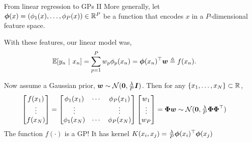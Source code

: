 \documentclass[aspectratio=169]{beamer}
\begin{document}
\begin{frame}{From linear regression to GPs II}
\label{slide:linreg}
More generally, let $\boldsymbol{\phi}(x) = (\phi_1(x), \ldots, \phi_P(x)) \in \mathbb{R}^P$ be a function that encodes $x$ in a $P$-dimensional feature space. 

With these features, our linear model was,
\begin{align}
    \mathbb{E}[y_n ~\vert~ x_n] = \sum_{p=1}^P w_p \phi_p(x_n) = \boldsymbol{\phi}(x_n)^\top \boldsymbol{w} &\triangleq f(x_n).
\end{align}

Now assume a Gaussian prior, $\boldsymbol{w} \sim \mathcal{N}(\boldsymbol{0}, \tfrac{\lambda}{P} \boldsymbol{I})$. Then for any $\{x_1, \ldots, x_N\} \subset \mathbb{R}$,
\begin{align}
    \begin{bmatrix}
    f(x_1) \\ \vdots \\ f(x_N)
    \end{bmatrix} 
    &=
    \begin{bmatrix}
    \phi_1(x_1) & \cdots & \phi_P(x_1) \\ 
    \vdots & & \vdots \\ 
    \phi_1(x_N) & \cdots & \phi_P(x_N) 
    \end{bmatrix}
    \begin{bmatrix}
    w_1 \\ \vdots \\ w_P
    \end{bmatrix}
    = \boldsymbol{\Phi} \boldsymbol{w} \sim \mathcal{N}(\boldsymbol{0}, \tfrac{\lambda}{P} \boldsymbol{\Phi} \boldsymbol{\Phi}^\top)
\end{align}
The function $f(\cdot)$ is a GP! It has kernel $K(x_i, x_j) = \tfrac{\lambda}{P} \boldsymbol{\phi}(x_i)^\top \boldsymbol{\phi}(x_j)$
\end{frame}

\end{document}
